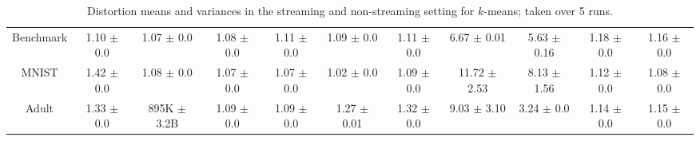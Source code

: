 \begin{table*}
\begin{tabular}{|c|cc|cc|cc|cc|cc|}
        Benchmark & 1.10 $\pm$ 0.0 & 1.07 $\pm$ 0.0 & 1.08 $\pm$ 0.0 & 1.11 $\pm$ 0.0 & 1.09 $\pm$ 0.0 & 1.11 $\pm$ 0.0 & 6.67 $\pm$ 0.01 & 5.63 $\pm$ 0.16 & 1.18 $\pm$ 0.0 & 1.16 $\pm$ 0.0 \\
        MNIST & 1.42 $\pm$ 0.0 & 1.08 $\pm$ 0.0 & 1.07 $\pm$ 0.0 & 1.07 $\pm$ 0.0 & 1.02 $\pm$ 0.0 & 1.09 $\pm$ 0.0 & 11.72 $\pm$ 2.53 & 8.13 $\pm$ 1.56 & 1.12 $\pm$ 0.0 & 1.08 $\pm$ 0.0 \\
        Adult & 1.33 $\pm$ 0.0 & 895K $\pm$ 3.2B & 1.09 $\pm$ 0.0 & 1.09 $\pm$ 0.0 & 1.27 $\pm$ 0.01 & 1.32 $\pm$ 0.0 & 9.03 $\pm$ 3.10 & 3.24 $\pm$ 0.0 & 1.14 $\pm$ 0.0 & 1.15 $\pm$ 0.0 \\
        \hline
    \end{tabular}
    \caption{Distortion means and variances in the streaming and non-streaming setting for $k$-means; taken over 5 runs.}
    \label{tbl:composition}
\end{table*}
\renewcommand{\arraystretch}{1}
